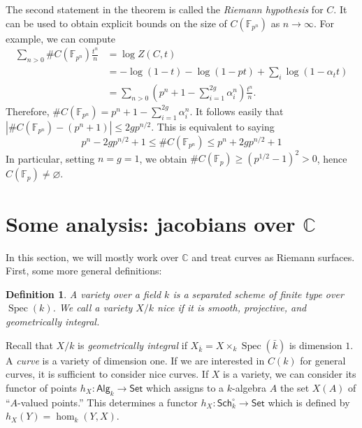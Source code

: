 \documentclass{article}
\DeclareMathOperator{\spec}{Spec}
\newtheorem{definition}[subsection]{Definition}
\theoremstyle{definition}
\begin{document}
The second statement in the theorem is called the \emph{Riemann hypothesis} 
for $C$. It can be used to obtain explicit bounds on the size of 
$C(\mathbb{F}_{p^n})$ as $n\to\infty$. For example, we can compute 
\begin{align*}
  \sum_{n>0} \# C(\mathbb{F}_{p^n}) \frac{t^n}{n} 
    &= \log Z(C,t) \\
    &= -\log(1-t) - \log(1-p t) + \sum_i \log(1-\alpha_t t) \\
    &= \sum_{n>0} \left(p^n+1-\sum_{i=1}^{2 g} \alpha_i^n\right) \frac{t^n}{n} \text{.}
\end{align*}
Therefore, $\# C(\mathbb{F}_{p^n}) = p^n+1-\sum_{i=1}^{2 g} \alpha_i^n$. It 
follows easily that $|\# C(\mathbb{F}_{p^n})-(p^n+1)| \leqslant 2 g p^{n/2}$. 
This is equivalent to saying 
\[
  p^n-2 g p^{n/2}+1 \leqslant \# C(\mathbb{F}_{p^n}) \leqslant p^n + 2 g p^{n/2} + 1
\]
In particular, setting $n = g = 1$, we obtain 
$\# C(\mathbb{F}_p) \geqslant (p^{1/2}-1)^2>0$, hence 
$C(\mathbb{F}_p)\ne\varnothing$. 











\section{Some analysis: jacobians over \texorpdfstring{$\mathbb{C}$}{C}}

In this section, we will mostly work over $\mathbb{C}$ and treat curves as 
Riemann surfaces. First, some more general definitions:

\begin{definition}
A \emph{variety} over a field $k$ is a separated scheme of finite type over 
$\spec(k)$. We call a variety $X/k$ \emph{nice} if it is smooth, projective, 
and geometrically integral.
\end{definition}

Recall that $X/k$ is \emph{geometrically integral} if 
$X_{\bar k}=X\times_k \spec(\bar k)$ is dimension $1$. A \emph{curve} is a 
variety of dimension one. If we are interested in $C(k)$ for general curves, 
it is sufficient to consider nice curves. If $X$ is a variety, we can consider 
its functor of points $h_X:\mathsf{Alg}_k\to \mathsf{Set}$ which assigns to a 
$k$-algebra $A$ the set $X(A)$ of ``$A$-valued points.'' This determines a 
functor $h_X:\mathsf{Sch}_k^\circ\to\mathsf{Set}$ which is defined by 
$h_X(Y)=\hom_k(Y,X)$. 
\end{document}
